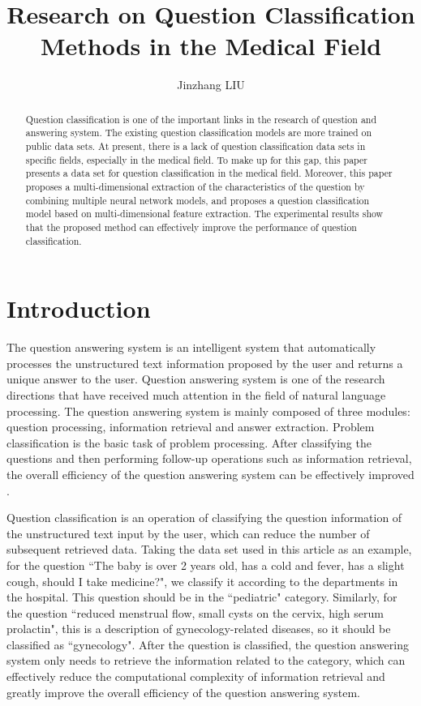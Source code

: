 \documentclass{article}
\title{Research on Question Classification Methods in the Medical Field}
\author[1*$\dag$]{Jinzhang LIU}
\affil[1]{Department of Information Engineering, the Chinese University of Hong Kong, Hong Kong, China.}
\affil[*]{Corresponding author. Email: liujinzhang@link.cuhk.edu.hk.com}
\date{}
\begin{document}
\maketitle

\begin{abstract}
Question classification is one of the important links in the research of question and answering system. The existing question classification models are more trained on public data sets. At present, there is a lack of question classification data sets in specific fields, especially in the medical field. To make up for this gap, this paper presents a data set for question classification in the medical field. Moreover, this paper proposes a multi-dimensional extraction of the characteristics of the question by combining multiple neural network models, and proposes a question classification model based on multi-dimensional feature extraction. The experimental results show that the proposed method can effectively improve the performance of question classification.
\end{abstract}


\section{Introduction}
The question answering system is an intelligent system that automatically processes the unstructured text information proposed by the user and returns a unique answer to the user. Question answering system is one of the research directions that have received much attention in the field of natural language processing. The question answering system is mainly composed of three modules: question processing, information retrieval and answer extraction. Problem classification is the basic task of problem processing. After classifying the questions and then performing follow-up operations such as information retrieval, the overall efficiency of the question answering system can be effectively improved \cite{abraham2000ibm}.

Question classification is an operation of classifying the question information of the unstructured text input by the user, which can reduce the number of subsequent retrieved data. Taking the data set used in this article as an example, for the question ``The baby is over 2 years old, has a cold and fever, has a slight cough, should I take medicine?", we classify it according to the departments in the hospital. This question should be in the ``pediatric" category. Similarly, for the question ``reduced menstrual flow, small cysts on the cervix, high serum prolactin", this is a description of gynecology-related diseases, so it should be classified as ``gynecology". After the question is classified, the question answering system only needs to retrieve the information related to the category, which can effectively reduce the computational complexity of information retrieval and greatly improve the overall efficiency of the question answering system.
\end{document}
